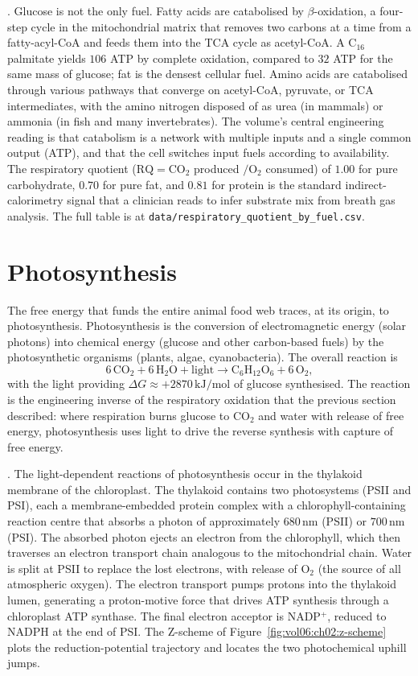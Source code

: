 . Glucose is not the only fuel.
Fatty acids are catabolised by $\beta$-oxidation, a four-step cycle
in the mitochondrial matrix that removes two carbons at a time from
a fatty-acyl-CoA and feeds them into the TCA cycle as acetyl-CoA. A
$\text{C}_{16}$ palmitate yields $106$ ATP by complete oxidation,
compared to $32$ ATP for the same mass of glucose; fat is the
densest cellular fuel. Amino acids are catabolised through various
pathways that converge on acetyl-CoA, pyruvate, or TCA intermediates,
with the amino nitrogen disposed of as urea (in mammals) or ammonia
(in fish and many invertebrates). The volume's central engineering
reading is that catabolism is a network with multiple inputs and a
single common output (ATP), and that the cell switches input fuels
according to availability. The respiratory quotient
($\text{RQ} = \text{CO}_2$ produced $/ \text{O}_2$ consumed) of $1.00$
for pure carbohydrate, $0.70$ for pure fat, and $0.81$ for protein is
the standard indirect-calorimetry signal that a clinician reads to
infer substrate mix from breath gas analysis. The full table is at
\texttt{data/respiratory\_quotient\_by\_fuel.csv}.

\section{Photosynthesis}

The free energy that funds the entire animal food web traces, at its
origin, to photosynthesis. Photosynthesis is the conversion of
electromagnetic energy (solar photons) into chemical energy (glucose
and other carbon-based fuels) by the photosynthetic organisms (plants,
algae, cyanobacteria). The overall reaction is
\[
6\,\text{CO}_2 + 6\,\text{H}_2\text{O} + \text{light} \longrightarrow
\text{C}_6\text{H}_{12}\text{O}_6 + 6\,\text{O}_2,
\]
with the light providing $\Delta G \approx +2870\,\text{kJ}/\text{mol}$
of glucose synthesised. The reaction is the engineering inverse of
the respiratory oxidation that the previous section described: where
respiration burns glucose to CO$_2$ and water with release of free
energy, photosynthesis uses light to drive the reverse synthesis with
capture of free energy.

. The light-dependent reactions of
photosynthesis occur in the thylakoid membrane of the chloroplast.
The thylakoid contains two photosystems (PSII and PSI), each a
membrane-embedded protein complex with a chlorophyll-containing
reaction centre that absorbs a photon of approximately $680\,\text{nm}$
(PSII) or $700\,\text{nm}$ (PSI). The absorbed photon ejects an
electron from the chlorophyll, which then traverses an electron
transport chain analogous to the mitochondrial chain. Water is split
at PSII to replace the lost electrons, with release of O$_2$ (the
source of all atmospheric oxygen). The electron transport pumps
protons into the thylakoid lumen, generating a proton-motive force
that drives ATP synthesis through a chloroplast ATP synthase. The
final electron acceptor is NADP$^+$, reduced to NADPH at the end of
PSI. The Z-scheme of Figure~\ref{fig:vol06:ch02:z-scheme} plots the
reduction-potential trajectory and locates the two photochemical
uphill jumps.

